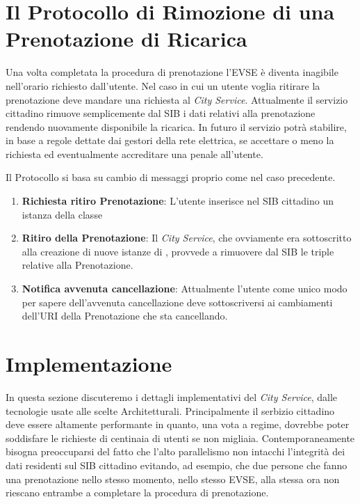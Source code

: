 \section{Il Protocollo di Rimozione di una Prenotazione di Ricarica}

Una volta completata la procedura di prenotazione l'EVSE è diventa inagibile nell'orario richiesto dall'utente. Nel caso in cui un utente voglia ritirare la prenotazione deve mandare una richiesta al \emph{City Service}. Attualmente il servizio cittadino rimuove semplicemente dal SIB i dati relativi alla prenotazione rendendo nuovamente disponibile la ricarica. In futuro il servizio potrà stabilire, in base a regole dettate dai gestori della rete elettrica, se accettare o meno la richiesta ed eventualmente accreditare una penale all'utente.

Il Protocollo si basa su cambio di messaggi proprio come nel caso precedente.

\begin{enumerate}
	\item \textbf{Richiesta ritiro Prenotazione}: L'utente inserisce nel SIB cittadino un istanza della classe  
	\item \textbf{Ritiro della Prenotazione}: Il \emph{City Service}, che ovviamente era sottoscritto alla creazione di nuove istanze di , provvede a rimuovere dal SIB le triple relative alla Prenotazione.
	\item \textbf{Notifica avvenuta cancellazione}: Attualmente l'utente come unico modo per sapere dell'avvenuta cancellazione deve sottoscriversi ai cambiamenti dell'URI della Prenotazione che sta cancellando.
\end{enumerate}

\section{Implementazione}\label{sec:impl}

In questa sezione discuteremo i dettagli implementativi del \emph{City Service}, dalle tecnologie usate alle scelte Architetturali. Principalmente il serbizio cittadino deve essere altamente performante in quanto, una vota a regime, dovrebbe poter soddisfare le richieste di centinaia di utenti se non migliaia. Contemporaneamente bisogna preoccuparsi del fatto che l'alto parallelismo non intacchi l'integrità dei dati residenti sul SIB cittadino evitando, ad esempio, che due persone che fanno una prenotazione nello stesso momento, nello stesso EVSE, alla stessa ora non riescano entrambe a completare la procedura di prenotazione. 

